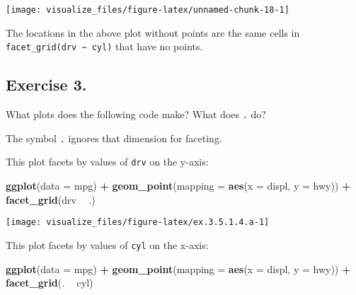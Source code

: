 \documentclass[]{book}
\newenvironment{Shaded}{\begin{snugshade}}{\end{snugshade}}
\newcommand{\DataTypeTok}[1]{\textcolor[rgb]{0.13,0.29,0.53}{#1}}
\newcommand{\KeywordTok}[1]{\textcolor[rgb]{0.13,0.29,0.53}{\textbf{#1}}}
\newcommand{\NormalTok}[1]{#1}
\newcommand{\OperatorTok}[1]{\textcolor[rgb]{0.81,0.36,0.00}{\textbf{#1}}}
\newcommand{\StringTok}[1]{\textcolor[rgb]{0.31,0.60,0.02}{#1}}
\theoremstyle{definition}
\theoremstyle{definition}
\theoremstyle{definition}
\theoremstyle{remark}
\begin{document}
\begin{center}\texttt{[image: visualize\_files/figure-latex/unnamed-chunk-18-1]} \end{center}

The locations in the above plot without points are the same cells in
\texttt{facet\_grid(drv\ \textasciitilde{}\ cyl)} that have no points.

\hypertarget{exercise-3.-2}{%
\subsection{Exercise 3.}\label{exercise-3.-2}}

What plots does the following code make? What does \texttt{.} do?

The symbol \texttt{.} ignores that dimension for faceting.

This plot facets by values of \texttt{drv} on the y-axis:

\begin{Shaded}
\begin{Highlighting}[]
\KeywordTok{ggplot}\NormalTok{(}\DataTypeTok{data =}\NormalTok{ mpg) }\OperatorTok{+}\StringTok{ }
\StringTok{  }\KeywordTok{geom_point}\NormalTok{(}\DataTypeTok{mapping =} \KeywordTok{aes}\NormalTok{(}\DataTypeTok{x =}\NormalTok{ displ, }\DataTypeTok{y =}\NormalTok{ hwy)) }\OperatorTok{+}
\StringTok{  }\KeywordTok{facet_grid}\NormalTok{(drv }\OperatorTok{~}\StringTok{ }\NormalTok{.)}
\end{Highlighting}
\end{Shaded}

\begin{center}\texttt{[image: visualize\_files/figure-latex/ex.3.5.1.4.a-1]} \end{center}

This plot facets by values of \texttt{cyl} on the x-axis:

\begin{Shaded}
\begin{Highlighting}[]
\KeywordTok{ggplot}\NormalTok{(}\DataTypeTok{data =}\NormalTok{ mpg) }\OperatorTok{+}\StringTok{ }
\StringTok{  }\KeywordTok{geom_point}\NormalTok{(}\DataTypeTok{mapping =} \KeywordTok{aes}\NormalTok{(}\DataTypeTok{x =}\NormalTok{ displ, }\DataTypeTok{y =}\NormalTok{ hwy)) }\OperatorTok{+}
\StringTok{  }\KeywordTok{facet_grid}\NormalTok{(. }\OperatorTok{~}\StringTok{ }\NormalTok{cyl)}
\end{Highlighting}
\end{Shaded}
\end{document}
